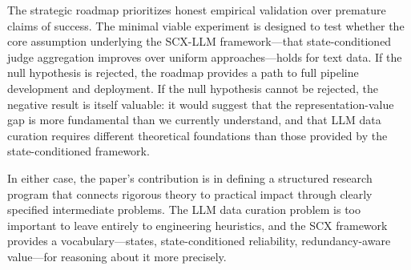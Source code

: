 \documentclass[11pt,twocolumn]{article}
\begin{document}
The strategic roadmap prioritizes honest empirical validation over premature claims of success. The minimal viable experiment is designed to test whether the core assumption underlying the SCX-LLM framework---that state-conditioned judge aggregation improves over uniform approaches---holds for text data. If the null hypothesis is rejected, the roadmap provides a path to full pipeline development and deployment. If the null hypothesis cannot be rejected, the negative result is itself valuable: it would suggest that the representation-value gap is more fundamental than we currently understand, and that LLM data curation requires different theoretical foundations than those provided by the state-conditioned framework.

In either case, the paper's contribution is in defining a structured research program that connects rigorous theory to practical impact through clearly specified intermediate problems. The LLM data curation problem is too important to leave entirely to engineering heuristics, and the SCX framework provides a vocabulary---states, state-conditioned reliability, redundancy-aware value---for reasoning about it more precisely.
\end{document}
